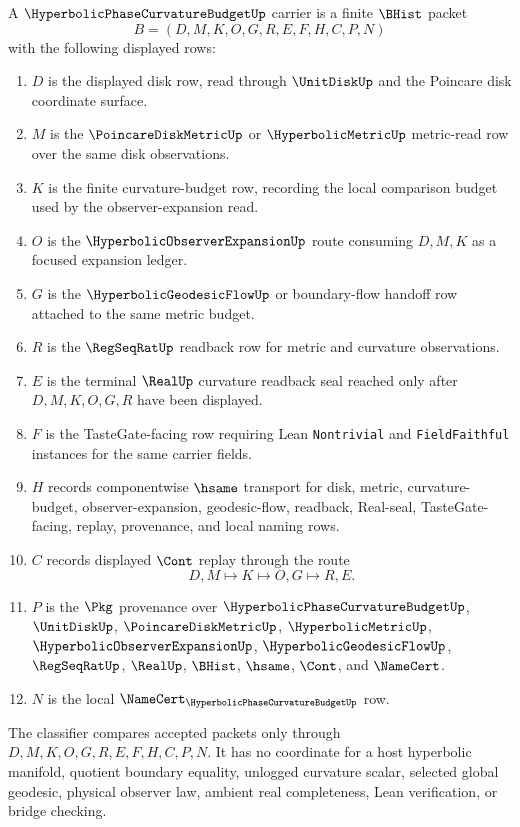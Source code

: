 \begin{definition}
\label{def:hyperbolic-phase-curvature-budget-carrier}
A $\HyperbolicPhaseCurvatureBudgetUp$ carrier is a finite $\BHist$ packet
$$
B=(D,M,K,O,G,R,E,F,H,C,P,N)
$$
with the following displayed rows:
\begin{enumerate}
\item $D$ is the displayed disk row, read through $\UnitDiskUp$ and the Poincare disk coordinate surface.
\item $M$ is the $\PoincareDiskMetricUp$ or $\HyperbolicMetricUp$ metric-read row over the same disk observations.
\item $K$ is the finite curvature-budget row, recording the local comparison budget used by the observer-expansion read.
\item $O$ is the $\HyperbolicObserverExpansionUp$ route consuming $D,M,K$ as a focused expansion ledger.
\item $G$ is the $\HyperbolicGeodesicFlowUp$ or boundary-flow handoff row attached to the same metric budget.
\item $R$ is the $\RegSeqRatUp$ readback row for metric and curvature observations.
\item $E$ is the terminal $\RealUp$ curvature readback seal reached only after $D,M,K,O,G,R$ have been displayed.
\item $F$ is the TasteGate-facing row requiring Lean \texttt{Nontrivial} and \texttt{FieldFaithful} instances for the same carrier fields.
\item $H$ records componentwise $\hsame$ transport for disk, metric, curvature-budget, observer-expansion, geodesic-flow, readback, Real-seal, TasteGate-facing, replay, provenance, and local naming rows.
\item $C$ records displayed $\Cont$ replay through the route
$$
D,M \longmapsto K \longmapsto O,G \longmapsto R,E .
$$
\item $P$ is the $\Pkg$ provenance over $\HyperbolicPhaseCurvatureBudgetUp$, $\UnitDiskUp$, $\PoincareDiskMetricUp$, $\HyperbolicMetricUp$, $\HyperbolicObserverExpansionUp$, $\HyperbolicGeodesicFlowUp$, $\RegSeqRatUp$, $\RealUp$, $\BHist$, $\hsame$, $\Cont$, and $\NameCert$.
\item $N$ is the local $\NameCert_{\HyperbolicPhaseCurvatureBudgetUp}$ row.
\end{enumerate}
The classifier compares accepted packets only through $D,M,K,O,G,R,E,F,H,C,P,N$. It has no coordinate for a host hyperbolic manifold, quotient boundary equality, unlogged curvature scalar, selected global geodesic, physical observer law, ambient real completeness, Lean verification, or bridge checking.
\end{definition}

